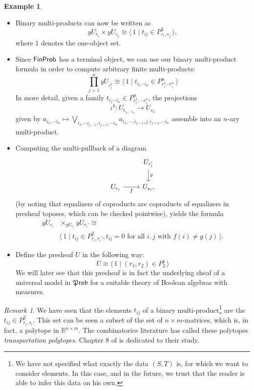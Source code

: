 \documentclass[a4paper]{amsproc}
\theoremstyle{plain}
\theoremstyle{definition}
\newtheorem{example}[theorem]{Example}
\theoremstyle{remark}
\newtheorem{remark}[theorem]{Remark}
\numberwithin{equation}{section}
\newcommand{\y}{\textit{y}}
\newcommand{\FinProb}{\textup{\textsf{FinProb}}}
\newcommand{\Prob}{\mathfrak{Prob}}
\newcommand{\la}{\langle\,}
\newcommand{\ra}{\,\rangle}
\begin{document}
\begin{example} \label{notation_example}
    \mbox{}
    \begin{itemize}
        \item Binary multi-products can now be written as
        \[ \y U_{r_i} \times \y U_{s_j} \cong \la 1 \mid t_{ij} \in P^2_{r_i,s_j} \ra, \]
        where $1$ denotes the one-object set.
        \item Since $\FinProb$ has a terminal object, we can use our binary multi-product formula in order to compute arbitrary finite multi-products:
        \[
            \prod_{j=1}^n \y U_{r_i^j} \cong \la 1 \mid t_{i_1 \cdots i_n} \in P^n_{r_i^1 \cdots r_i^n} \ra
        \]
        In more detail, given a family $t_{i_1\cdots i_n} \in P^n_{r_i^1,\cdots r_i^n}$, the projections
        \[
            \iota^k: U_{t_{i_1,\cdots i_n}} \to U_{r_k}
        \]
        given by $a_{i_1,\cdots i_n} \mapsto \bigvee_{i_1,\cdots i_{j-1}, i_{j+1},\cdots i_n} a_{i_1,\cdots,i_{j-1},j,i_{j+1},\cdots i_n}$ assemble into an $n$-ary multi-product.
        \item Computing the multi-pullback of a diagram
        \[
            \begin{tikzcd}
            & U_{r'_i} \arrow[d, "g"] \\
            U_{r_i} \arrow[r, "f"'] & U_{s_i} ,
            \end{tikzcd}
        \]
        (by noting that equalizers of coproducts are coproducts of equalizers in presheaf toposes, which can be checked pointwise), yields the formula
        \begin{equation*}
            \begin{split}
            \y U_{r_i} &\times_{\y U_{s_i}} \y U_{r_i'} \cong \\
            &\la 1 \mid t_{ij} \in P^2_{r_i, r_i'}, t_{ij} = 0 \text{ for all } i,j \text{ with } f(i) \neq g(j) \ra .
            \end{split}
        \end{equation*}
        \item Define the presheaf $U$ in the following way:
        \[ U \cong \la 1 \mid (r_1,r_2) \in P^1_2 \ra \]
        We will later see that this presheaf is in fact the underlying sheaf of a universal model in $\Prob$ for a suitable theory of Boolean algebras with measures.
    \end{itemize}
\end{example}

\begin{remark} We have seen that the elements $t_{ij}$ of a binary multi-product\footnote{We have not specified what exactly the data $(S,T)$ is, for which we want to consider elements. In this case, and in the future, we trust that the reader is able to infer this data on his own.} are the $t_{ij} \in P^2_{r_i,s_i}$. This set can be seen a subset of the set of $n\times m$-matrices, which is, in fact, a polytope in $\mathbb{R}^{n\times m}$. The combinatorics literature has called these polytopes \emph{transportation polytopes}. Chapter 8 of \cite{brualdi2006combinatorial} is dedicated to their study.
\end{remark}
\end{document}
